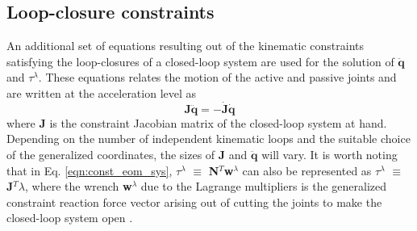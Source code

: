 \subsection{Loop-closure constraints}
\label{c5lcc}
An additional set of equations resulting out of the kinematic constraints satisfying the loop-closures of a closed-loop system are used for the solution of $\ddot{\textbf{q}}$ and \mbox{\boldmath$\tau$}$^\lambda$. These equations relates the motion of the active and passive joints and are written at the acceleration level as
\begin{equation}
\label{eqn:lcc}
\mathbf{J\ddot{q}} = -\mathbf{\dot{J}\dot{q}} 
\end{equation}
where \textbf{J} is the constraint Jacobian matrix of the closed-loop system at hand. Depending on the number of independent kinematic loops and the suitable choice of the generalized coordinates, the sizes of \textbf{J} and $\ddot{\textbf{q}}$ will vary. It is worth noting that in Eq. \ref{eqn:const_eom_sys}, \mbox{\boldmath$\tau$}$^\lambda$ $\equiv$ \textbf{N$^T$w$^\lambda$} can also be represented as \mbox{\boldmath$\tau$}$^\lambda$ $\equiv$ \textbf{J$^T$}\mbox{\boldmath$\lambda$}, where the wrench \textbf{w}$^\lambda$ due to the Lagrange multipliers is the generalized constraint reaction force vector arising out of cutting the joints to make the closed-loop system open \citep{blajer1994projective,blajer2002elimination,blajer2011methods}.

